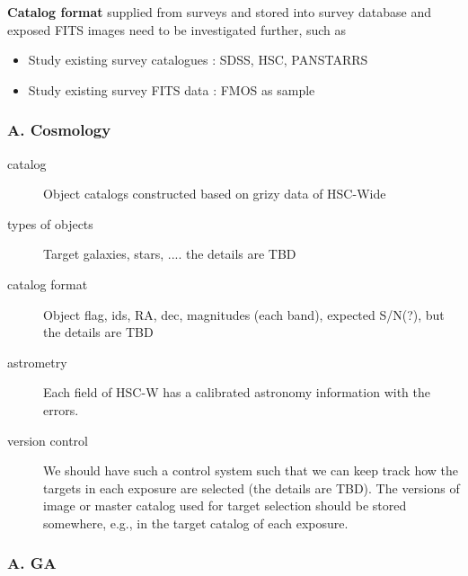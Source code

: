 \documentclass[a4paper,notitlepage]{article}
\begin{document}
{\bf Catalog format} supplied from surveys and stored into survey database 
and exposed FITS images need to be investigated further, such as
\begin{itemize}
  \item Study existing survey catalogues : SDSS, HSC, PANSTARRS
  \item Study existing survey FITS data : FMOS as sample
\end{itemize}

\subsubsection{A. Cosmology}

\begin{description}
    \item[catalog] Object catalogs constructed based on grizy data of HSC-Wide 
    \item[types of objects] Target galaxies, stars, .... the details are TBD
    \item[catalog format] Object flag, ids, RA, dec, magnitudes (each band), expected S/N(?), but the details are TBD
    \item[astrometry] Each field of HSC-W has a calibrated astronomy information with the errors. 
    \item[version control] We should have such a control system such that we 
      can keep track how the targets in each exposure are selected  (the details are TBD). The versions of image or master catalog used for target selection should be stored somewhere, e.g., in the target catalog of each exposure. 
\end{description}

\subsubsection{A. GA}
\end{document}
